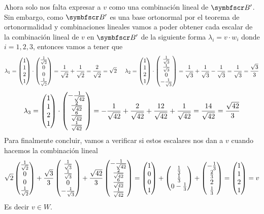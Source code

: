     Ahora solo nos falta expresar a \(v\) como una combinación lineal de \(\fb'\).
    Sin embargo, como \(\fb'\) es una base ortonormal por el teorema de ortonormalidad y combinaciones lineales 
    vamos a poder obtener cada escalar de la combinación lineal de \(v\) en \(\fb'\) de la siguiente forma \(\lambda_i = v \cdot w_i\) donde \(i = 1, 2, 3\),
    entonces vamos a tener que 
    \[
        \lambda_1 = 
            \fvec{1,1,2,1} 
            \cdot 
            \fvec{
                \frac{1}{\sqrt{2}},
                0,
                0,
                \frac{1}{\sqrt{2}}
            }
        =
        \frac{1}{\sqrt{2}} + \frac{1}{\sqrt{2}}
        =
        \frac{2}{\sqrt{2}}
        =
        \sqrt{2}
    \hspace{0.5cm}
    \lambda_2 = 
        \fvec{1,1,2,1}
        \cdot
        \fvec{
            \frac{1}{\sqrt{3}},
            \frac{1}{\sqrt{3}},
            0,
            -\frac{1}{\sqrt{3}}
        }
        =
            \frac{1}{\sqrt{3}}
            +
            \frac{1}{\sqrt{3}}
            -
            \frac{1}{\sqrt{3}}
        =
        \frac{1}{\sqrt{3}}
        =
        \frac{\sqrt{3}}{3}
    \]
    \[
        \lambda_3 
        =
        \fvec{1,1,2,1}
        \cdot
        \fvec{
            -\frac{1}{\sqrt{42}},
            \frac{2}{\sqrt{42}},
            \frac{6}{\sqrt{42}},
            \frac{1}{\sqrt{42}}
        }
        =
        -\frac{1}{\sqrt{42}}
        +
        \frac{2}{\sqrt{42}}
        +
        \frac{12}{\sqrt{42}}
        +
        \frac{1}{\sqrt{42}}
        =
        \frac{14}{\sqrt{42}}
        =
        \frac{\sqrt{42}}{3}
    \]
    Para finalmente concluir, vamos a verificar si estos escalares nos dan a \(v\) cuando hacemos la combinación lineal
    \[
        \sqrt{2}
        \fvec{
            \frac{1}{\sqrt{2}},
            0,
            0,
            \frac{1}{\sqrt{2}}
        }
        +
        \frac{\sqrt{3}}{3}
        \fvec{
            \frac{1}{\sqrt{3}},
            \frac{1}{\sqrt{3}},
            0,
            -\frac{1}{\sqrt{3}}
        }
        +
        \frac{\sqrt{42}}{3}
        \fvec{
            -\frac{1}{\sqrt{42}},
            \frac{2}{\sqrt{42}},
            \frac{6}{\sqrt{42}},
            \frac{1}{\sqrt{42}}
        }
        =
        \fvec{1,0,0,1}
        +
        \fvec{
            \frac{1}{3},
            \frac{1}{3},
            0
            -\frac{1}{3}
        }
        +
        \fvec{
            -\frac{1}{3},
            \frac{2}{3},
            2,
            \frac{1}{3}
        }
        =
        \fvec{1,1,2,1}
        =
        v
    \]
    Es decir \(v \in W\).
